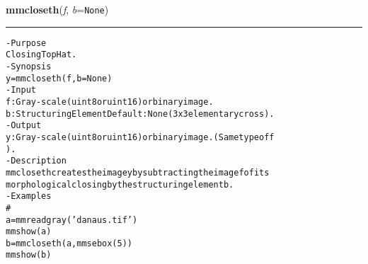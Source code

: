     \label{multireg:num_pymorph:mmcloseth}
    \vspace{0.5ex}

    \begin{boxedminipage}{\textwidth}

    \raggedright \textbf{mmcloseth}(\textit{f}, \textit{b}=\texttt{N\-o\-n\-e\-})

    \vspace{-1.5ex}

    \rule{\textwidth}{0.5\fboxrule}
\begin{alltt}
- Purpose
    Closing Top Hat.
- Synopsis
    y = mmcloseth(f, b=None)
- Input
    f: Gray-scale (uint8 or uint16) or binary image.
    b: Structuring Element Default: None (3x3 elementary cross).
- Output
    y: Gray-scale (uint8 or uint16) or binary image. (Same type of f
       ).
- Description
    mmcloseth creates the image y by subtracting the image f of its
    morphological closing by the structuring element b .
- Examples
    \#
    a = mmreadgray('danaus.tif')
    mmshow(a)
    b = mmcloseth(a,mmsebox(5))
    mmshow(b)\end{alltt}

    \vspace{1ex}

    \end{boxedminipage}

    \label{multireg:num_pymorph:mmcmp}
    \vspace{0.5ex}

